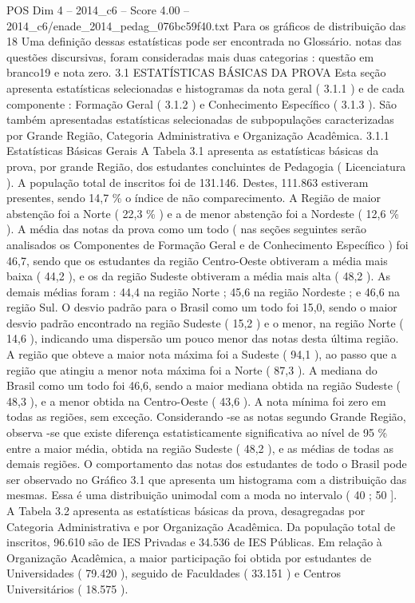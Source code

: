 \begin{textsample}{POS Dim 4 – 2014\_c6 – Score 4.00 – 2014\_c6/enade\_2014\_pedag\_076bc59f40.txt}
Para os gráficos de distribuição das 18 Uma definição dessas estatísticas pode ser encontrada no Glossário. notas das questões discursivas, foram consideradas mais duas categorias : questão em branco19 e nota zero. 3.1 ESTATÍSTICAS BÁSICAS DA PROVA Esta seção apresenta estatísticas selecionadas e histogramas da nota geral ( 3.1.1 ) e de cada componente : Formação Geral ( 3.1.2 ) e Conhecimento Específico ( 3.1.3 ).
São também apresentadas estatísticas selecionadas de subpopulações caracterizadas por Grande Região, Categoria Administrativa e Organização Acadêmica. 3.1.1 Estatísticas Básicas Gerais A Tabela 3.1 apresenta as estatísticas básicas da prova, por grande Região, dos estudantes concluintes de Pedagogia ( Licenciatura ).
A população total de inscritos foi de 131.146.
Destes, 111.863 estiveram presentes, sendo 14,7 \% o índice de não comparecimento.
A Região de maior abstenção foi a Norte ( 22,3 \% ) e a de menor abstenção foi a Nordeste ( 12,6 \% ).
A média das notas da prova como um todo ( nas seções seguintes serão analisados os Componentes de Formação Geral e de Conhecimento Específico ) foi 46,7, sendo que os estudantes da região Centro-Oeste obtiveram a média mais baixa ( 44,2 ), e os da região Sudeste obtiveram a média mais alta ( 48,2 ).
As demais médias foram : 44,4 na região Norte ; 45,6 na região Nordeste ; e 46,6 na região Sul.
O desvio padrão para o Brasil como um todo foi 15,0, sendo o maior desvio padrão encontrado na região Sudeste ( 15,2 ) e o menor, na região Norte ( 14,6 ), indicando uma dispersão um pouco menor das notas desta última região.
A região que obteve a maior nota máxima foi a Sudeste ( 94,1 ), ao passo que a região que atingiu a menor nota máxima foi a Norte ( 87,3 ).
A mediana do Brasil como um todo foi 46,6, sendo a maior mediana obtida na região Sudeste ( 48,3 ), e a menor obtida na Centro-Oeste ( 43,6 ).
A nota mínima foi zero em todas as regiões, sem exceção.
Considerando -se as notas segundo Grande Região, observa -se que existe diferença estatisticamente significativa ao nível de 95 \% entre a maior média, obtida na região Sudeste ( 48,2 ), e as médias de todas as demais regiões.
O comportamento das notas dos estudantes de todo o Brasil pode ser observado no Gráfico 3.1 que apresenta um histograma com a distribuição das mesmas.
Essa é uma distribuição unimodal com a moda no intervalo ( 40 ; 50 ].
A Tabela 3.2 apresenta as estatísticas básicas da prova, desagregadas por Categoria Administrativa e por Organização Acadêmica.
Da população total de inscritos, 96.610 são de IES Privadas e 34.536 de IES Públicas.
Em relação à Organização Acadêmica, a maior participação foi obtida por estudantes de Universidades ( 79.420 ), seguido de Faculdades ( 33.151 ) e Centros Universitários ( 18.575 ).

\end{textsample}

